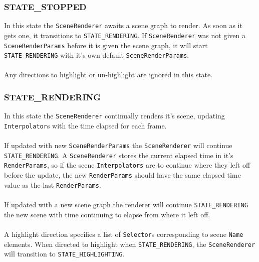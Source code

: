 \documentclass[10pt,aps, prb,preprint]{article}
\begin{document}
\subsubsection{STATE\_STOPPED}
In this state the \texttt{SceneRenderer} awaits a scene graph to render. As soon as it gets one, it transitions to \texttt{STATE\_RENDERING}. If \texttt{SceneRenderer} was not given a \texttt{SceneRenderParams} before it is given the scene graph, it will start \texttt{STATE\_RENDERING} with it's own default \texttt{SceneRenderParams}.
\\
\\
Any directions to highlight or un-highlight are ignored in this state.

\subsubsection{STATE\_RENDERING}
In this state the \texttt{SceneRenderer} continually renders it's scene, updating \texttt{Interpolator}s with the time elapsed for each frame.
\\
\\
If updated with new \texttt{SceneRenderParams} the \texttt{SceneRenderer} will continue \texttt{STATE\_RENDERING}. A \texttt{SceneRenderer} stores the current elapsed time in it's \texttt{RenderParams}, so if the scene \texttt{Interpolators} are to continue where they left off before the update, the new \texttt{RenderParams} should have the same elapsed time value as the last \texttt{RenderParams}.
\\
\\
If updated with a new scene graph the renderer will continue \texttt{STATE\_RENDERING} the new scene with time continuing to elapse from where it left off.
\\
\\
A highlight direction specifies a list of \texttt{Selector}s corresponding to scene \texttt{Name} elements. When directed to highlight when \texttt{STATE\_RENDERING}, the \texttt{SceneRenderer} will transition to \texttt{STATE\_HIGHLIGHTING}.
\end{document}
